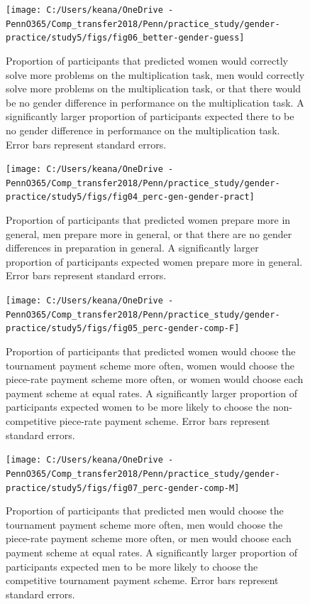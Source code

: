 \documentclass[a4paper, nobind]{templates/ociamthesis}
\begin{document}
\begin{figure}

{\centering \texttt{[image: C:/Users/keana/OneDrive - PennO365/Comp\_transfer2018/Penn/practice\_study/gender-practice/study5/figs/fig06\_better-gender-guess]} 

}

\caption{Proportion of participants that predicted women would correctly solve more problems on the multiplication task, men would correctly solve more problems on the multiplication task, or that there would be no gender difference in performance on the multiplication task. A significantly larger proportion of participants expected there to be no gender difference in performance on the multiplication task. Error bars represent standard errors.}\label{fig:s404}
\end{figure}

\begin{figure}

{\centering \texttt{[image: C:/Users/keana/OneDrive - PennO365/Comp\_transfer2018/Penn/practice\_study/gender-practice/study5/figs/fig04\_perc-gen-gender-pract]} 

}

\caption{Proportion of participants that predicted women prepare more in general, men prepare more in general, or that there are no gender differences in preparation in general. A significantly larger proportion of participants expected women prepare more in general. Error bars represent standard errors.}\label{fig:s406}
\end{figure}

\begin{figure}

{\centering \texttt{[image: C:/Users/keana/OneDrive - PennO365/Comp\_transfer2018/Penn/practice\_study/gender-practice/study5/figs/fig05\_perc-gender-comp-F]} 

}

\caption{Proportion of participants that predicted women would choose the tournament payment scheme more often, women would choose the piece-rate payment scheme more often, or women would choose each payment scheme at equal rates. A significantly larger proportion of participants expected women to be more likely to choose the non-competitive piece-rate payment scheme. Error bars represent standard errors.}\label{fig:s408}
\end{figure}

\begin{figure}

{\centering \texttt{[image: C:/Users/keana/OneDrive - PennO365/Comp\_transfer2018/Penn/practice\_study/gender-practice/study5/figs/fig07\_perc-gender-comp-M]} 

}

\caption{Proportion of participants that predicted men would choose the tournament payment scheme more often, men would choose the piece-rate payment scheme more often, or men would choose each payment scheme at equal rates. A significantly larger proportion of participants expected men to be more likely to choose the competitive tournament payment scheme. Error bars represent standard errors.}\label{fig:s409}
\end{figure}
\end{document}
